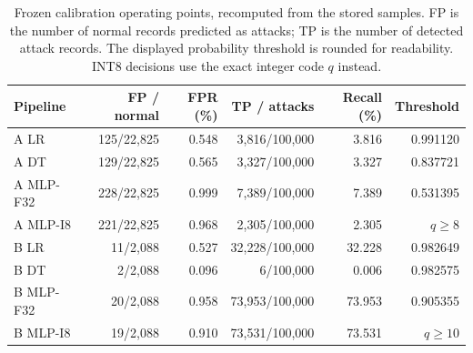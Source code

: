 \begin{table}[H]
\caption{Frozen calibration operating points, recomputed from the stored samples. FP is the number of normal records predicted as attacks; TP is the number of detected attack records. The displayed probability threshold is rounded for readability. INT8 decisions use the exact integer code $q$ instead.}\label{tab:calibration}
\centering\small
\begin{tabular}{lrrrrr}
\toprule
Pipeline & FP / normal & FPR (\%) & TP / attacks & Recall (\%) & Threshold \\
\midrule
A LR & 125/22,825 & 0.548 & 3,816/100,000 & 3.816 & 0.991120 \\
A DT & 129/22,825 & 0.565 & 3,327/100,000 & 3.327 & 0.837721 \\
A MLP-F32 & 228/22,825 & 0.999 & 7,389/100,000 & 7.389 & 0.531395 \\
A MLP-I8 & 221/22,825 & 0.968 & 2,305/100,000 & 2.305 & $q\geq 8$ \\
B LR & 11/2,088 & 0.527 & 32,228/100,000 & 32.228 & 0.982649 \\
B DT & 2/2,088 & 0.096 & 6/100,000 & 0.006 & 0.982575 \\
B MLP-F32 & 20/2,088 & 0.958 & 73,953/100,000 & 73.953 & 0.905355 \\
B MLP-I8 & 19/2,088 & 0.910 & 73,531/100,000 & 73.531 & $q\geq 10$ \\
\bottomrule
\end{tabular}
\end{table}
